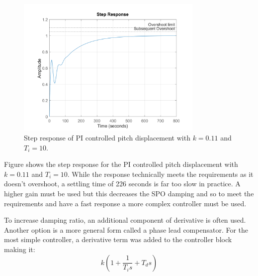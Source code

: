 \documentclass{article}
\begin{document}
\begin{figure}[H]
    \centering
    \includegraphics[width=0.8\textwidth]{figures/pitch_autopilot_uncompensated_step.png}
    \caption{Step response of PI controlled pitch displacement with $k=0.11$ and $T_i = 10$.}
    \label{fig:pitch_autopilot_uncompensated_step}
\end{figure}

Figure shows the step response for the PI controlled pitch displacement with $k=0.11$ and $T_i = 10$.
While the response technically meets the requirements as it doesn't overshoot, a settling time of 226 seconds is far too slow in practice.
A higher gain must be used but this decreases the SPO damping and so to meet the requirements and have a fast response a more complex controller must be used.

To increase damping ratio, an additional component of derivative is often used.
Another option is a more general form called a phase lead compensator.
For the most simple controller, a derivative term was added to the controller block making it:
\begin{equation}
    k\left(1 + \frac{1}{T_i s} + T_d s\right)
\end{equation}
\end{document}
